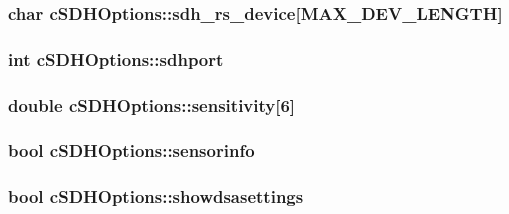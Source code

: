 \hypertarget{classcSDHOptions_aa33357676ec18be7dbd162e7dac93406}{
\subsubsection[{sdh\-\_\-rs\-\_\-device}]{\setlength{\rightskip}{0pt plus 5cm}char {\bf c\-S\-D\-H\-Options\-::sdh\-\_\-rs\-\_\-device}\mbox{[}{\bf \-M\-A\-X\-\_\-\-D\-E\-V\-\_\-\-L\-E\-N\-G\-T\-H}\mbox{]}}}\label{classcSDHOptions_aa33357676ec18be7dbd162e7dac93406}
\hypertarget{classcSDHOptions_a565bf00d92a0aca8729c3bd1e0f92be2}{
\subsubsection[{sdhport}]{\setlength{\rightskip}{0pt plus 5cm}int {\bf c\-S\-D\-H\-Options\-::sdhport}}}\label{classcSDHOptions_a565bf00d92a0aca8729c3bd1e0f92be2}
\hypertarget{classcSDHOptions_addfa8552244a84c62fe26ef5c261a19d}{
\subsubsection[{sensitivity}]{\setlength{\rightskip}{0pt plus 5cm}double {\bf c\-S\-D\-H\-Options\-::sensitivity}\mbox{[}6\mbox{]}}}\label{classcSDHOptions_addfa8552244a84c62fe26ef5c261a19d}
\hypertarget{classcSDHOptions_a9ea9c47ffd54eb7a557e672cc76b23d3}{
\subsubsection[{sensorinfo}]{\setlength{\rightskip}{0pt plus 5cm}bool {\bf c\-S\-D\-H\-Options\-::sensorinfo}}}\label{classcSDHOptions_a9ea9c47ffd54eb7a557e672cc76b23d3}
\hypertarget{classcSDHOptions_a73021f34d61c57f5991490b8dda9b557}{
\subsubsection[{showdsasettings}]{\setlength{\rightskip}{0pt plus 5cm}bool {\bf c\-S\-D\-H\-Options\-::showdsasettings}}}\label{classcSDHOptions_a73021f34d61c57f5991490b8dda9b557}
